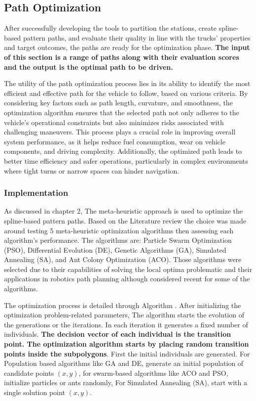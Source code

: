 \newpage
\subsection{Path Optimization}
After successfully developing the tools to partition the stations, create spline-based pattern paths, and evaluate their quality 
in line with the trucks' properties and target outcomes, the paths are ready for the optimization phase.
\textbf{The input of this section is a range of paths along with their evaluation scores and the output is the optimal 
path to be driven.}

The utility of the path optimization process lies in its ability to identify the most efficient and effective path for the 
vehicle to follow, based on various criteria. By considering key factors such as path length, curvature, and smoothness, 
the optimization algorithm ensures that the selected path not only adheres to the vehicle's operational constraints but 
also minimizes risks associated with challenging maneuvers. This process plays a crucial role in improving overall system 
performance, as it helps reduce fuel consumption, wear on vehicle components, and driving complexity. Additionally, 
the optimized path leads to better time efficiency and safer operations, particularly in complex environments where 
tight turns or narrow spaces can hinder navigation.

\subsubsection{Implementation}
As discussed in chapter 2, The meta-heuristic approach is used to optimize the spline-based pattern paths. 
Based on the Literature review the choice was made around testing 5 meta-heuristic optimization algorithms then 
assessing each algorithm's performance. The algorithms are: Particle Swarm Optimization (PSO), Differential Evolution (DE),
Genetic Algorithms (GA), Simulated Annealing (SA), and Ant Colony Optimization (ACO). Those algorithms were selected due 
to their capabilities of solving the local optima problematic and their applications in robotics path planning although 
considered recent for some of the algorithms. 

The optimization process is detailed through Algorithm . After initializing the optimization problem-related
parameters, The algorithm starts the evolution of the generations or the iterations. In each iteration it generates a fixed 
number of individuals. \textbf{The decision vector of each individual is the transition point. The optimization algorithm
starts by placing random transition points inside the subpolygons}. First the initial individuals are generated. 
For Population based algorithms like GA and DE, generate an initial population of candidate points $(x, y)$, for swarm-based algorithms
like ACO and PSO, 
initialize particles or ants randomly, For Simulated Annealing (SA), start with a single solution point $(x, y)$.\\


